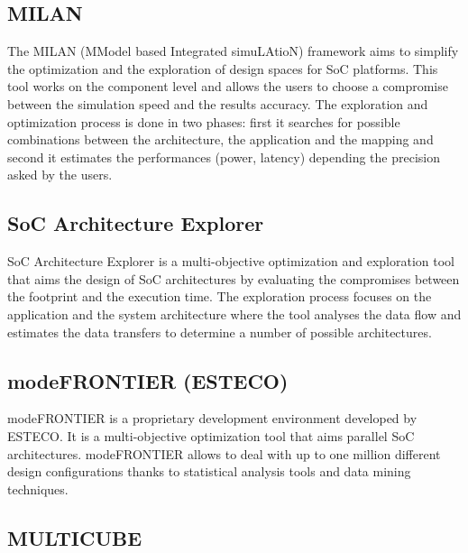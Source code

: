 \subsection{MILAN}

The MILAN (MModel based Integrated simuLAtioN) framework \cite{Mohanty02rapidsystem-level} aims to simplify the optimization and the exploration of design spaces for SoC platforms. This tool works on the component level and allows the users to choose a compromise between the simulation speed and the results accuracy. The exploration and optimization process is done in two phases: first it searches for possible combinations between the architecture, the application and the mapping and second it estimates the performances (power, latency) depending the precision asked by the users.

\subsection{SoC Architecture Explorer}

SoC Architecture Explorer \cite{ueda05architecture} is a multi-objective optimization and exploration tool that aims the design of SoC architectures by evaluating the compromises between the footprint and the execution time. The exploration process focuses on the application and the system architecture where the tool analyses the data flow and estimates the data transfers to determine a number of possible architectures.

\subsection{modeFRONTIER (ESTECO)}

modeFRONTIER \cite{esteco01} is a proprietary development environment developed by ESTECO. It is a multi-objective optimization tool that aims parallel SoC architectures. modeFRONTIER allows to deal with up to one million different design configurations thanks to statistical analysis tools and data mining techniques.

\subsection{MULTICUBE}

